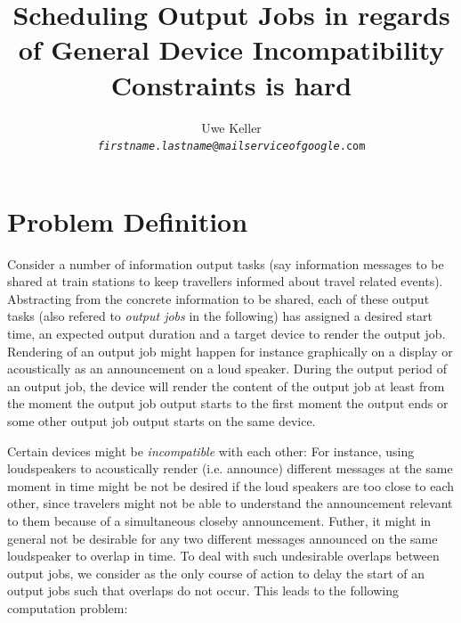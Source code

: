 \documentclass{article}
\title{Scheduling Output Jobs in regards of General Device Incompatibility Constraints is hard}
\author{Uwe Keller\\{\tt {\em firstname}.{\em lastname}@{\em mailserviceofgoogle}.com}}
\begin{document}
\maketitle


\section{Problem Definition}\label{sec:problem-definition}
Consider a number of information output tasks (say information messages to be shared at train stations to keep travellers informed about travel related events). Abstracting from the concrete information to be shared, each of these output tasks (also refered to {\em output jobs} in the following) has assigned a desired start time, an expected output duration and a target device to render the output job. Rendering of an output job might happen for instance graphically on a display or acoustically as an announcement on a loud speaker. During the output period of an output job, the device will render the content of the output job at least from the moment the output job output starts to the first moment the output ends or some other output job output starts on the same device. 

Certain devices might be {\em incompatible} with each other: For instance, using loudspeakers to acoustically render (i.e. announce) different messages at the same moment in time might be not be desired if the loud speakers are too close to each other, since travelers might not be able to understand the announcement relevant to them because of a simultaneous closeby announcement. Futher, it might in general not be desirable for any two different messages announced on the same loudspeaker to overlap in time.
To deal with such undesirable overlaps between output jobs, we consider as the only course of action to delay the start of an output jobs such that overlaps do not occur. This leads to the following computation problem:
\end{document}
